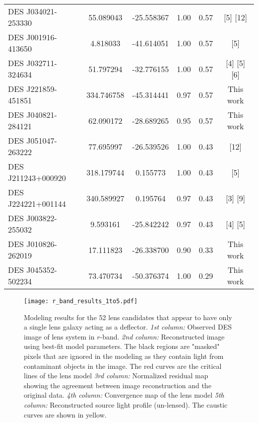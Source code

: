 \documentclass[tradiabstract,twocolumn]{aa}
\begin{document}
{\begin{longtable}{lccccc}
 DES J034021-253330 &   55.089043 & -25.558367 &      1.00 &                    0.57 &                      [5]  [12] \\
 DES J001916-413650 &    4.818033 & -41.614051 &      1.00 &                    0.57 &                            [5] \\
 DES J032711-324634 &   51.797294 & -32.776155 &      1.00 &                    0.57 &                  [4]  [5]  [6] \\
 DES J221859-451851 &  334.746758 & -45.314441 &      0.97 &                    0.57 &                      This work \\
 DES J040821-284121 &   62.090172 & -28.689265 &      0.95 &                    0.57 &                      This work \\
 DES J051047-263222 &   77.695997 & -26.539526 &      1.00 &                    0.43 &                           [12] \\
 DES J211243+000920 &  318.179744 &   0.155773 &      1.00 &                    0.43 &                            [5] \\
 DES J224221+001144 &  340.589927 &   0.195764 &      0.97 &                    0.43 &                       [3]  [9] \\
 DES J003822-255032 &    9.593161 & -25.842242 &      0.97 &                    0.43 &                       [4]  [5] \\
 DES J010826-262019 &   17.111823 & -26.338700 &      0.90 &                    0.33 &                      This work \\
 DES J045352-502234 &   73.470734 & -50.376374 &      1.00 &                    0.29 &                      This work \\
\end{longtable}
}



\begin{figure*}[p!]
\centering
\texttt{[image: r\_band\_results\_1to5.pdf]}
\caption{Modeling results for the 52 lens candidates that appear to have only a single lens galaxy acting as a deflector. \textit{1st column:} Observed DES image of lens system in $r$-band. \textit{2nd column:} Reconstructed image using best-fit model parameters. The black regions are "masked" pixels that are ignored in the modeling as they contain light from contaminant objects in the image. The red curves are the critical lines of the lens model \textit{3rd column:} Normalized residual map showing the agreement between image reconstruction and the original data. \textit{4th column:} Convergence map of the lens model \textit{5th column:} Reconstructed source light profile (un-lensed). The caustic curves are shown in yellow. }
\label{Fig: modeling mosaic 1}
\end{figure*}
   
\end{document}
